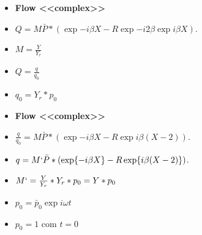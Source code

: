 \documentclass[10pt]{beamer}
\theoremstyle{remark}
\theoremstyle{definition}
\begin{document}
\begin{frame}[allowframebreaks]
\begin{itemize}
\end{itemize}

\framebreak

\begin{itemize}
\item \textbf{Flow <<complex>>}
\item $ Q = M \bar{P} * (\exp{-i\beta X} - R\exp{-i2\beta}\exp{i\beta X})$.
\item $ M = \frac{Y}{Y_r}$
\item $ Q = \frac{q}{q_0}$
\item $ q_0 = Y_r * p_0$

\end{itemize}

\framebreak

\begin{itemize}
	\item \textbf{Flow <<complex>>}
	\item $ \frac{q}{q_0} = M \bar{P} * (\exp{-i\beta X} - R\exp{i\beta(X - 2)})$.
	\item $ q = M` \bar{P} * (\exp{-i\beta X} - R\exp{i\beta(X - 2)})$.
	\item $ M` = \frac{Y}{Y_r} * Y_r * p_0 = Y * p_0$
	\item $p_0 = \bar{p}_0 \exp{i\omega t}$
	\item $p_0 = 1$ com $t = 0$
	
\end{itemize}

\end{frame}
	
\end{document}
